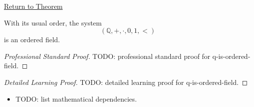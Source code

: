 \newpage
{}
\label{prf:q-is-ordered-field}

\begin{remark*}[Return]
\hyperref[thm:q-is-ordered-field]{Return to Theorem}
\end{remark*}

\begin{theorem*}
With its usual order, the system
\[
(\mathbb{Q},+,\cdot,0,1,<)
\]
is an ordered field.
\end{theorem*}

\begin{proof}[Professional Standard Proof]
\LRAProofBodyStart
TODO: professional standard proof for q-is-ordered-field.
\end{proof}

\begin{proof}[Detailed Learning Proof]
\LRAProofBodyStart
TODO: detailed learning proof for q-is-ordered-field.
\end{proof}

\begin{remark*}
\end{remark*}

\begin{dependencies}
\begin{itemize}
  \item TODO: list mathematical dependencies.
\end{itemize}
\end{dependencies}

\clearpage
